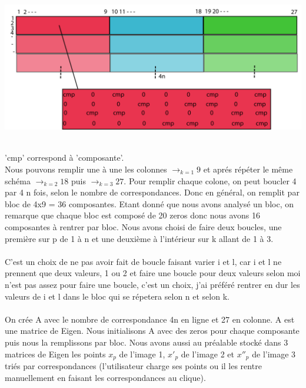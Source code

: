 \documentclass[a4paper,11pt,fleqn]{report}
\begin{document}
\\
\begin{center}\includegraphics[width=1.2\textwidth]{./schema2.png}\end{center}
\\
'cmp' correspond \`a 'composante'.\\ Nous pouvons remplir une \`a une les colonnes $\to_{k=1} 9$ et apr\'es r\'ep\'eter le m\^eme sch\'ema $\to_{k=2} 18$ puis $\to_{k=3} 27$. Pour remplir  chaque colone, on peut boucler 4 par 4 n fois, selon le nombre de correspondances. Donc en g\'en\'eral, on remplit par bloc de 4x9 = 36 composantes. Etant donn\'e que nous avons analys\'e un bloc, on remarque que chaque bloc est compos\'e de 20 zeros donc nous avons 16 composantes \`a rentrer par bloc. Nous avons choisi de faire deux boucles, une premi\`ere sur p de 1 \`a n et une deuxi\`eme \`a l'int\'erieur sur k allant de 1 \`a 3.\\\\C'est un choix de ne pas avoir fait de boucle faisant varier i et l, car i et l ne prennent que deux valeurs, 1 ou 2 et faire une boucle pour deux valeurs selon moi n'est pas assez pour faire une boucle, c'est un choix, j'ai pr\'ef\'er\'e rentrer en dur les valeurs de i et l dans le bloc qui se r\'epetera selon n et selon k.
\\
\\On cr\'ee A avec le nombre de correspondance 4n en ligne et 27 en colonne. A est une matrice de Eigen. Nous initialisons A avec des zeros pour chaque composante puis nous la remplissons par bloc. Nous avons aussi au pr\'ealable stock\'e dans 3 matrices de Eigen les points $x_p$ de l'image 1, $x'_p$ de l'image 2 et $x''_p$ de l'image 3 tri\'es par correspondances (l'utilisateur charge ses points ou il les rentre manuellement en faisant les correspondances au clique). 

	\\
	\\
	\\
\end{document}
